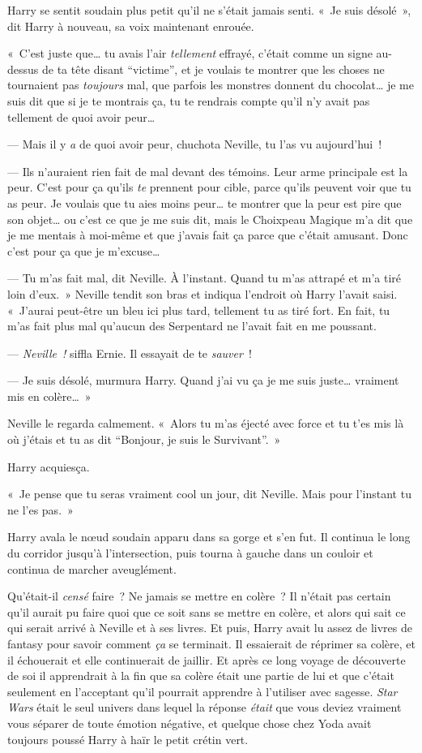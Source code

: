 Harry se sentit soudain plus petit qu'il ne s'était jamais senti. «~Je suis désolé~», dit Harry à nouveau, sa voix maintenant enrouée.

«~C'est juste que… tu avais l'air \emph{tellement} effrayé, c'était comme un signe au-dessus de ta tête disant “victime”, et je voulais te montrer que les choses ne tournaient pas \emph{toujours} mal, que parfois les monstres donnent du chocolat… je me suis dit que si je te montrais ça, tu te rendrais compte qu'il n'y avait pas tellement de quoi avoir peur…

--- Mais il y \emph{a} de quoi avoir peur, chuchota Neville, tu l'as vu aujourd'hui~!

--- Ils n'auraient rien fait de mal devant des témoins. Leur arme principale est la peur. C'est pour ça qu'ils \emph{te} prennent pour cible, parce qu'ils peuvent voir que tu as peur. Je voulais que tu aies moins peur… te montrer que la peur est pire que son objet… ou c'est ce que je me suis dit, mais le Choixpeau Magique m'a dit que je me mentais à moi-même et que j'avais fait ça parce que c'était amusant. Donc c'est pour ça que je m'excuse…

--- Tu m'as fait mal, dit Neville. À l'instant. Quand tu m'as attrapé et m'a tiré loin d'eux.~» Neville tendit son bras et indiqua l'endroit où Harry l'avait saisi. «~J'aurai peut-être un bleu ici plus tard, tellement tu as tiré fort. En fait, tu m'as fait plus mal qu'aucun des Serpentard ne l'avait fait en me poussant.

--- \emph{Neville~!} siffla Ernie. Il essayait de te \emph{sauver}~!

--- Je suis désolé, murmura Harry. Quand j'ai vu ça je me suis juste… vraiment mis en colère…~»

Neville le regarda calmement. «~Alors tu m'as éjecté avec force et tu t'es mis là où j'étais et tu as dit “Bonjour, je suis le Survivant”.~»

Harry acquiesça.

«~Je pense que tu seras vraiment cool un jour, dit Neville. Mais pour l'instant tu ne l'es pas.~»

Harry avala le nœud soudain apparu dans sa gorge et s'en fut. Il continua le long du corridor jusqu'à l'intersection, puis tourna à gauche dans un couloir et continua de marcher aveuglément.

Qu'était-il \emph{censé} faire~? Ne jamais se mettre en colère~? Il n'était pas certain qu'il aurait pu faire quoi que ce soit sans se mettre en colère, et alors qui sait ce qui serait arrivé à Neville et à ses livres. Et puis, Harry avait lu assez de livres de fantasy pour savoir comment \emph{ça} se terminait. Il essaierait de réprimer sa colère, et il échouerait et elle continuerait de jaillir. Et après ce long voyage de découverte de soi il apprendrait à la fin que sa colère était une partie de lui et que c'était seulement en l'acceptant qu'il pourrait apprendre à l'utiliser avec sagesse. \emph{Star Wars} était le seul univers dans lequel la réponse \emph{était} que vous deviez vraiment vous séparer de toute émotion négative, et quelque chose chez Yoda avait toujours poussé Harry à haïr le petit crétin vert.

